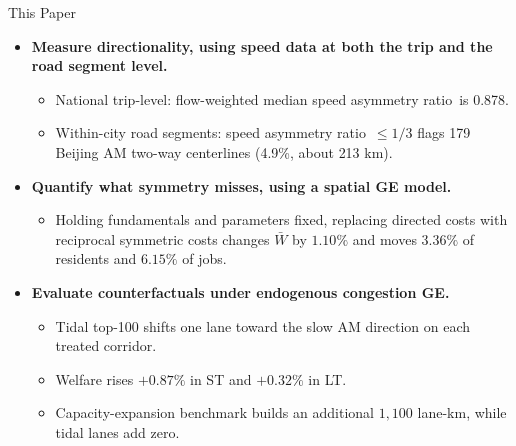 \documentclass[11pt,aspectratio=169]{beamer}
\newcommand{\good}[1]{\textcolor{blue!70!black}{#1}}
\newcommand{\SAR}{speed asymmetry ratio}
\begin{document}
\begin{frame}{This Paper}
\small
\begin{itemize}
  \item \textbf{Measure directionality, using speed data at both the trip and the road segment level.}
  \begin{itemize}\footnotesize
    \item National trip-level: flow-weighted median \SAR\ is \good{0.878}.
    \item Within-city road segments: \SAR\ $\leq1/3$ flags \good{179} Beijing AM two-way centerlines (\good{4.9\%}, about \good{213 km}).
  \end{itemize}
  \item \textbf{Quantify what symmetry misses, using a spatial GE model.}
  \begin{itemize}\footnotesize
    \item Holding fundamentals and parameters fixed, replacing directed costs with reciprocal symmetric costs changes $\bar W$ by \good{$1.10\%$} and moves \good{$3.36\%$} of residents and \good{$6.15\%$} of jobs.
  \end{itemize}
  \item \textbf{Evaluate counterfactuals under endogenous congestion GE.}
  \begin{itemize}\footnotesize
    \item Tidal top-100 shifts one lane toward the slow AM direction on each treated corridor.
    \item Welfare rises \good{$+0.87\%$} in ST and \good{$+0.32\%$} in LT.
    \item Capacity-expansion benchmark builds an additional \good{$1{,}100$ lane-km}, while tidal lanes add \good{zero}.
  \end{itemize}
\end{itemize}
\end{frame}
\end{document}

